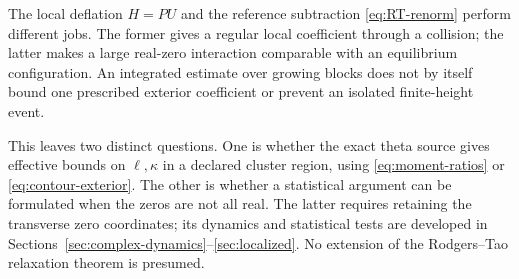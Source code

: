 The local deflation \(H=P U\) and the reference subtraction
\eqref{eq:RT-renorm} perform different jobs. The former gives a
regular local coefficient through a collision; the latter makes
a large real-zero interaction comparable with an equilibrium
configuration. An integrated estimate over growing blocks does
not by itself bound one prescribed exterior coefficient or
prevent an isolated finite-height event.

This leaves two distinct questions. One is whether the exact theta
source gives effective bounds on \(\ell,\kappa\) in a declared
cluster region, using \eqref{eq:moment-ratios} or
\eqref{eq:contour-exterior}. The other is whether a statistical
argument can be formulated when the zeros are not all real.
The latter requires retaining the transverse zero coordinates;
its dynamics and statistical tests are developed in
Sections~\ref{sec:complex-dynamics}--\ref{sec:localized}. No extension
of the Rodgers--Tao relaxation theorem is presumed.
